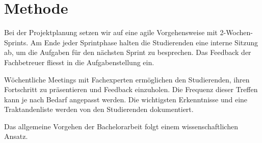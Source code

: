 
\section{Methode} 
Bei der Projektplanung setzen wir auf eine agile Vorgehensweise mit 2-Wochen-Sprints. Am Ende jeder Sprintphase halten die Studierenden eine interne Sitzung ab, um die Aufgaben für den nächsten Sprint zu besprechen. Das Feedback der Fachbetreuer fliesst in die Aufgabenstellung ein.

Wöchentliche Meetings mit Fachexperten ermöglichen den Studierenden, ihren Fortschritt zu präsentieren und Feedback einzuholen. Die Frequenz dieser Treffen kann je nach Bedarf angepasst werden. Die wichtigsten Erkenntnisse und eine Traktandenliste werden von den Studierenden dokumentiert.

Das allgemeine Vorgehen der Bachelorarbeit folgt einem wissenschaftlichen Ansatz.
